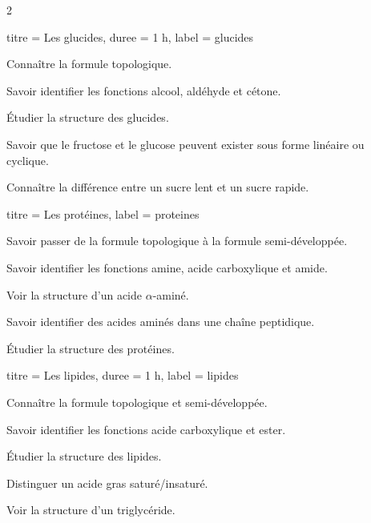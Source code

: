 \begin{multicols}{2}
  \begin{TP}{titre = Les glucides, duree = 1 h, label = glucides}
    \begin{prerequis}
      \item Connaître la formule topologique.
      \item Savoir identifier les fonctions alcool, aldéhyde et cétone.
    \end{prerequis}
    \begin{objectifs}  
      \item Étudier la structure des glucides.
      \item Savoir que le fructose et le glucose peuvent exister sous forme linéaire ou cyclique.
      \item Connaître la différence entre un sucre lent et un sucre rapide.
    \end{objectifs}
  \end{TP}
  \smallskip

  \setcounter{activiteNum}{1}
  \begin{activite}{titre = Les protéines, label = proteines}
    \begin{prerequis}
      \item Savoir passer de la formule topologique à la formule semi-développée.
      \item Savoir identifier les fonctions amine, acide carboxylique et amide.
    \end{prerequis}
    \begin{objectifs}
      \item Voir la structure d'un acide $\alpha$-aminé.
      \item Savoir identifier des acides aminés dans une chaîne peptidique.
      \item Étudier la structure des protéines.
    \end{objectifs}
  \end{activite}

  \setcounter{activiteNum}{0}
  \begin{activite}{titre = Les lipides, duree =  1 h, label = lipides}
    \begin{prerequis}
      \item Connaître la formule topologique et semi-développée.
      \item Savoir identifier les fonctions acide carboxylique et ester.
    \end{prerequis}
    \begin{objectifs}
      \item Étudier la structure des lipides.
      \item Distinguer un acide gras saturé/insaturé.
      \item Voir la structure d'un triglycéride.
    \end{objectifs}
  \end{activite}
  \smallskip


\end{multicols}
